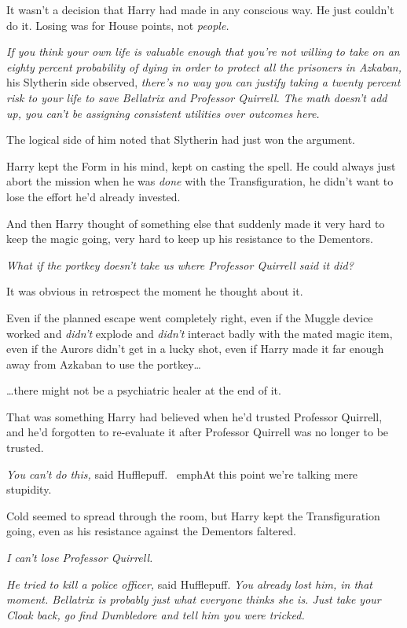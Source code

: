 It wasn't a decision that Harry had made in any conscious way. He just couldn't 
do it. Losing was for House points, not \emph{people.}

\emph{If you think your own life is valuable enough that you're not willing to 
take on an eighty percent probability of dying in order to protect all the 
prisoners in Azkaban,} his Slytherin side observed, \emph{there's no way you 
can justify taking a twenty percent risk to your life to save Bellatrix and 
Professor Quirrell. The math doesn't add up, you can't be assigning consistent 
utilities over outcomes here.}

The logical side of him noted that Slytherin had just won the argument.

Harry kept the Form in his mind, kept on casting the spell. He could always 
just abort the mission when he was \emph{done} with the Transfiguration, he 
didn't want to lose the effort he'd already invested.

And then Harry thought of something else that suddenly made it very hard to 
keep the magic going, very hard to keep up his resistance to the Dementors.

\emph{What if the portkey doesn't take us where Professor Quirrell said it did?}

It was obvious in retrospect the moment he thought about it.

Even if the planned escape went completely right, even if the Muggle device 
worked and \emph{didn't} explode and \emph{didn't} interact badly with the 
mated magic item, even if the Aurors didn't get in a lucky shot, even if Harry 
made it far enough away from Azkaban to use the portkey{\ldots}

{\ldots}there might not be a psychiatric healer at the end of it.

That was something Harry had believed when he'd trusted Professor Quirrell, and 
he'd forgotten to re-evaluate it after Professor Quirrell was no longer to be 
trusted.

\emph{You can't do this,} said Hufflepuff. \ emph{At this point we're talking 
mere stupidity.}

Cold seemed to spread through the room, but Harry kept the Transfiguration 
going, even as his resistance against the Dementors faltered.

\emph{I can't lose Professor Quirrell.}

\emph{He tried to kill a police officer,} said Hufflepuff. \emph{You already 
lost him, in that moment. Bellatrix is probably just what everyone thinks she 
is. Just take your Cloak back, go find Dumbledore and tell him you were 
tricked.}

